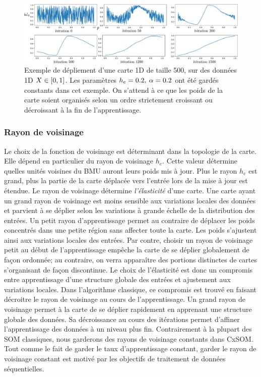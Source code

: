 \begin{figure}
\centering
\includegraphics[width=\textwidth]{depliement_1D.pdf}
\caption{Exemple de dépliement d'une carte 1D de taille 500, sur des données 1D $X \in [0,1]$. Les paramètres $h_{e} = 0.2, \: \alpha = 0.2$ ont été gardés constants dans cet exemple. On s'attend à ce que les poids de la carte soient organisés selon un ordre strictement croissant ou décroissant à la fin de l'apprentissage.}
\label{fig:depliement}
\end{figure}

\subsubsection{Rayon de voisinage}
Le choix de la fonction de voisinage est déterminant dans la topologie de la carte. Elle dépend en particulier du rayon de voisinage $h_e$.
Cette valeur détermine quelles unités voisines du BMU auront leurs poids mis à jour.
Plus le rayon $h_e$ est grand, plus la partie de la carte déplacée vers l'entrée lors de la mise à jour est étendue. 
Le rayon de voisinage détermine \emph{l'élasticité} d'une carte. Une carte ayant un grand rayon de voisinage est moins sensible aux variations locales des données et parvient à se déplier selon les variations à grande échelle de la distribution des entrées.
Un petit rayon d'apprentissage permet au contraire de déplacer les poids concentrés dans une petite région sans affecter toute la carte. Les poids s'ajustent ainsi aux variations locales des entrées. Par contre, choisir un rayon de voisinage petit au début de l'apprentissage empêche la carte de se déplier globalement de façon ordonnée; au contraire, on verra apparaître des portions distinctes de cartes s'organisant de façon discontinue.
Le choix de l'élasticité est donc un compromis entre apprentissage d'une structure globale des entrées et ajustement aux variations locales.
Dans l'algorithme classique, ce compromis est trouvé en faisant décroitre le rayon de voisinage au cours de l'apprentissage. Un grand rayon de voisinage permet à la carte de se déplier rapidement en apprenant une structure globale des données. Sa décroissance au cours des itérations permet d'affiner l'apprentissage des données à un niveau plus fin. 
Contrairement à la plupart des SOM classiques, nous garderons des rayons de voisinage constants dans CxSOM. Tout comme le fait de garder le taux d'apprentissage constant, garder le rayon de voisinage constant est motivé par les objectifs de traitement de données séquentielles.

